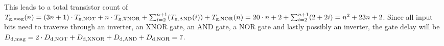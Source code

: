 \begin{itemize}
    This leads to a total transistor count of $\f{T}{g}{mag}(n) = (3n + 1) \cdot \f{T}{g}{NOT} + n \cdot \f{T}{g}{XNOR} + \sum_{i = 2}^{n + 1}(\f{T}{g}{AND}(i)) + \f{T}{g}{NOR}(n) = 20 \cdot n + 2 + \sum_{i = 2}^{n + 1}(2 + 2i) = n^{2} + 23n + 2$. Since all input bits need to traverse through an inverter, an XNOR gate, an AND gate, a NOR gate and lastly possibly an inverter, the gate delay will be $\f{D}{d}{mag} = 2 \cdot \f{D}{d}{NOT} + \f{D}{d}{XNOR} + \f{D}{d}{AND} + \f{D}{d}{NOR} = 7$.
\end{itemize}
\newcommand{\eqln}[9]{#1
  &          $\begin{aligned}&\f{T}{g}{#1}#2 = #3\end{aligned}$
  &\ifnn{#5} $\begin{aligned}&\f{T}{t}{#1}#4 = #5\end{aligned}$ \fi
  &          $\begin{aligned}&\f{D}{d}{#1}#6 = #7\end{aligned}$
  &\ifnn{#9} $\begin{aligned}&\f{D}{c}{#1}#8 = #9\end{aligned}$ \fi
  \\\hline
}
